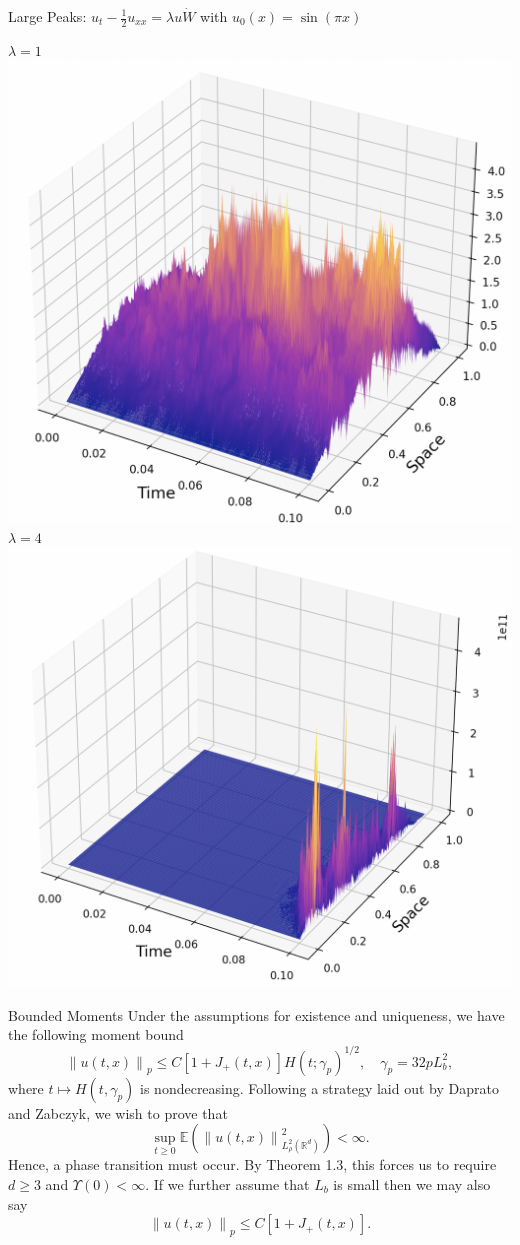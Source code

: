 \documentclass{beamer}%
\numberwithin{equation}{section}
\newcommand{\R}{\mathbb{R}}
\newcommand{\Norm}[1]{\left\|  #1   \right\|}
\begin{document}
\begin{frame}{Large Peaks: $u_t - \frac{1}{2}u_{xx} = \lambda u \dot{W}$ with $u_0(x) = \sin(\pi x)$}
\begin{center}
	$\lambda = 1$ \includegraphics[scale=.2]{lambda1} \quad $\lambda = 4$ \includegraphics[scale=.2]{lambda4}
	\end{center}
\end{frame}

\begin{frame}{Bounded Moments}
	Under the assumptions for existence and uniqueness, we have the following moment bound
	\[
	\Norm{u(t,x)}_p \le C[1 + J_+(t,x)]H(t;\gamma_p)^{1/2}, \quad \gamma_p = 32pL_b^2,
	\]
	where $t\mapsto H(t,\gamma_p)$ is nondecreasing. Following a strategy laid out by Daprato and Zabczyk, we wish to prove that 
	\[
	\sup_{t \ge 0} \mathbb{E}\left( \Norm{u(t,x)}_{L^2_{\rho}(\R^d)}^2 \right) < \infty .
	\]
	Hence, a phase transition must occur. By Theorem 1.3, this forces us to require $d \ge 3$ and $\Upsilon(0) < \infty$. If we further assume that $L_b$ is small then we may also say 
	\[
	\Norm{u(t,x)}_p \le C[1 + J_+(t,x)].
	\]
	
\end{frame}
\end{document}
